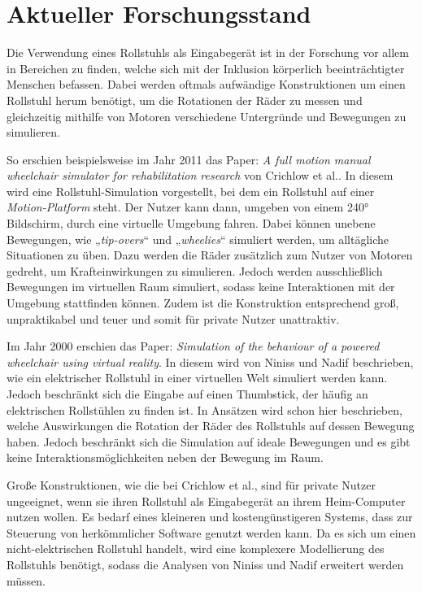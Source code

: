 \chapter{Aktueller Forschungsstand}
Die Verwendung eines Rollstuhls als Eingabegerät ist in der Forschung vor allem in Bereichen zu finden, welche sich mit der Inklusion körperlich beeinträchtigter Menschen befassen\cite{buxbaumAssessmentSpatialAttention2008}.
Dabei werden oftmals aufwändige Konstruktionen um einen Rollstuhl herum benötigt, um die Rotationen der Räder zu messen und gleichzeitig mithilfe von Motoren verschiedene Untergründe und Bewegungen zu simulieren.

So erschien beispielsweise im Jahr 2011 das Paper: \textit{A full motion manual\\wheelchair simulator for rehabilitation research} von Crichlow et al.\cite{crichlowFullMotionManual2011}.
In diesem wird eine Rollstuhl-Simulation vorgestellt, bei dem ein Rollstuhl auf einer \textit{Motion-Platform} steht.
Der Nutzer kann dann, umgeben von einem 240° Bildschirm, durch eine virtuelle Umgebung fahren.
Dabei können unebene Bewegungen, wie „\textit{tip-overs}“ und „\textit{wheelies}“ simuliert werden, um alltägliche Situationen zu üben\cite{crichlowFullMotionManual2011}.
Dazu werden die Räder zusätzlich zum Nutzer von Motoren gedreht, um Krafteinwirkungen zu simulieren.
Jedoch werden ausschließlich Bewegungen im virtuellen Raum simuliert, sodass keine Interaktionen mit der Umgebung stattfinden können.
Zudem ist die Konstruktion entsprechend groß, unpraktikabel und teuer und somit für private Nutzer unattraktiv.

Im Jahr 2000 erschien das Paper: \textit{Simulation of the behaviour of a powered wheelchair using virtual reality}\cite{ninissSimulationBehaviourPowered2000}.
In diesem wird von Niniss und Nadif beschrieben, wie ein elektrischer Rollstuhl in einer virtuellen Welt simuliert werden kann.
Jedoch beschränkt sich die Eingabe auf einen Thumbstick, der häufig an elektrischen Rollstühlen zu finden ist.
In Ansätzen wird schon hier beschrieben, welche Auswirkungen die Rotation der Räder des Rollstuhls auf dessen Bewegung haben.
Jedoch beschränkt sich die Simulation auf ideale Bewegungen und es gibt keine Interaktionsmöglichkeiten neben der Bewegung im Raum.

Große Konstruktionen, wie die bei Crichlow et al., sind für private Nutzer ungeeignet, wenn sie ihren Rollstuhl als Eingabegerät an ihrem Heim-Computer nutzen wollen.
Es bedarf eines kleineren und kostengünstigeren Systems, dass zur Steuerung von herkömmlicher Software genutzt werden kann.
Da es sich um einen nicht-elektrischen Rollstuhl handelt, wird eine komplexere Modellierung des Rollstuhls benötigt, sodass die Analysen von Niniss und Nadif erweitert werden müssen.
